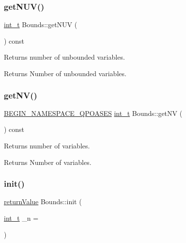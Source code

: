 \subsubsection{\texorpdfstring{get\+N\+U\+V()}{getNUV()}}
{\footnotesize\ttfamily \hyperlink{_types_8hpp_ab6fd6105e64ed14a0c9281326f05e623}{int\+\_\+t} Bounds\+::get\+N\+UV (\begin{DoxyParamCaption}{ }\end{DoxyParamCaption}) const\hspace{0.3cm}{\ttfamily [inline]}}

Returns number of unbounded variables. \begin{DoxyReturn}{Returns}
Number of unbounded variables. 
\end{DoxyReturn}
\mbox{\label{class_bounds_a2c32c7cbab64f671ffecca74a3253d1b}} 
\subsubsection{\texorpdfstring{get\+N\+V()}{getNV()}}
{\footnotesize\ttfamily \hyperlink{_types_8hpp_afd127fcb3c8f47975e9fa0ec2bacde52}{B\+E\+G\+I\+N\+\_\+\+N\+A\+M\+E\+S\+P\+A\+C\+E\+\_\+\+Q\+P\+O\+A\+S\+ES} \hyperlink{_types_8hpp_ab6fd6105e64ed14a0c9281326f05e623}{int\+\_\+t} Bounds\+::get\+NV (\begin{DoxyParamCaption}{ }\end{DoxyParamCaption}) const\hspace{0.3cm}{\ttfamily [inline]}}

Returns number of variables. \begin{DoxyReturn}{Returns}
Number of variables. 
\end{DoxyReturn}
\mbox{\label{class_bounds_a1ae1d7d6e084ce84420ad5086b7af4ab}} 
\subsubsection{\texorpdfstring{init()}{init()}}
{\footnotesize\ttfamily \hyperlink{_message_handling_8hpp_a81d556f613bfbabd0b1f9488c0fa865e}{return\+Value} Bounds\+::init (\begin{DoxyParamCaption}\item[{\hyperlink{_types_8hpp_ab6fd6105e64ed14a0c9281326f05e623}{int\+\_\+t}}]{\+\_\+n = {} }\end{DoxyParamCaption})}

